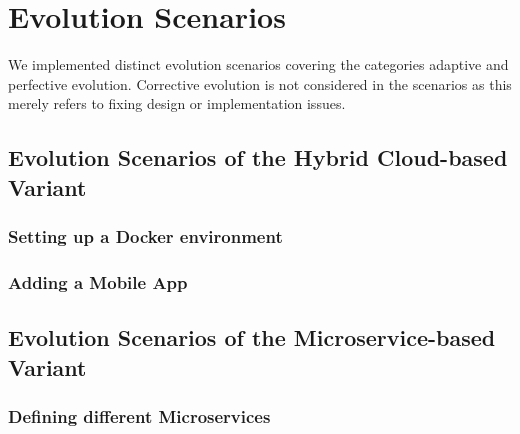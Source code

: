 \section{Evolution Scenarios}
We implemented distinct evolution scenarios covering the categories adaptive and perfective
evolution. Corrective evolution is not considered in the scenarios as this merely refers to fixing design or implementation issues.

\subsection{Evolution Scenarios of the Hybrid Cloud-based Variant}
\subsubsection{Setting up a Docker environment}
\subsubsection{Adding a Mobile App}


\subsection{Evolution Scenarios of the Microservice-based Variant}

\subsubsection{Defining different Microservices}


	
	
